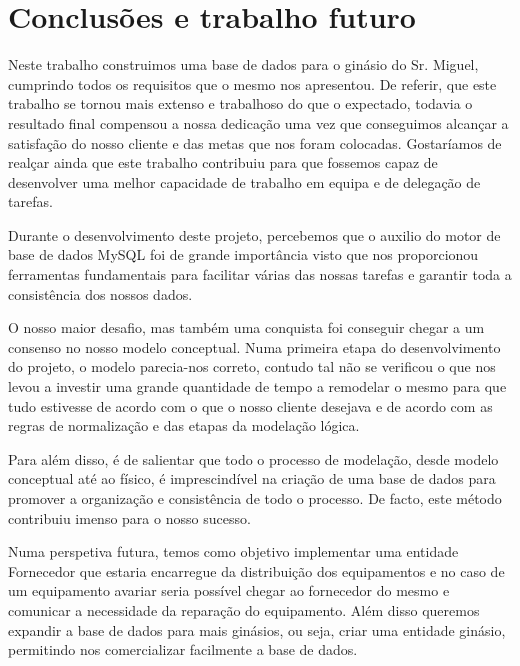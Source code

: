 \chapter{Conclusões e trabalho futuro}

Neste trabalho construimos uma  base de dados para o ginásio do Sr. Miguel, cumprindo todos os requisitos que o mesmo nos  apresentou. De referir, que este trabalho se tornou mais extenso e trabalhoso do que o expectado, todavia o resultado final compensou a nossa dedicação uma vez que conseguimos alcançar a satisfação do nosso cliente e das metas que nos foram  colocadas. Gostaríamos de realçar ainda que este trabalho contribuiu para que fossemos capaz de desenvolver uma melhor capacidade de trabalho em equipa e de delegação de tarefas.  \par
Durante o desenvolvimento deste projeto, percebemos que o auxilio do motor de base de dados MySQL foi de grande importância visto que nos proporcionou ferramentas fundamentais para facilitar várias das nossas tarefas e garantir toda a consistência dos nossos dados.

\par O nosso maior desafio, mas também uma conquista foi conseguir chegar a um consenso no nosso modelo conceptual. Numa primeira etapa do desenvolvimento do projeto, o modelo parecia-nos correto, contudo tal não se verificou o que nos levou a investir uma grande quantidade de tempo a remodelar o mesmo para que tudo estivesse de acordo com o que o nosso cliente desejava e de acordo com as regras de normalização e das etapas da modelação lógica.\par
Para além disso, é de salientar que todo o processo de modelação, desde modelo conceptual até ao físico, é imprescindível na criação de uma base de dados para promover a organização e consistência de todo o processo. De facto, este método contribuiu imenso para o nosso sucesso.
\par Numa perspetiva futura, temos como objetivo implementar uma entidade Fornecedor que estaria encarregue da distribuição dos equipamentos e no caso de um equipamento avariar seria possível chegar ao fornecedor do mesmo e comunicar a necessidade da reparação do equipamento. Além disso queremos expandir a base de dados para mais ginásios, ou seja, criar uma entidade ginásio, permitindo nos comercializar facilmente a base de dados.